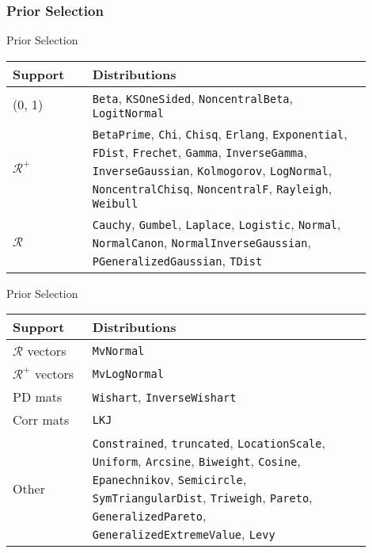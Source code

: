 \subsubsection{Prior Selection}
\begin{frame}{Prior Selection}
	\begin{center}
	\begin{tabular}{||p{0.2\linewidth} p{0.7\linewidth}||} 
	 \hline
	 Support & Distributions \\ [0.5ex] 
	 \hline\hline
	 (0, 1) & \lstinline{Beta}, \lstinline{KSOneSided}, \lstinline{NoncentralBeta}, \lstinline{LogitNormal} \\ 
	 \hline
	 $\mathcal{R}^+$ & \lstinline{BetaPrime}, \lstinline{Chi}, \lstinline{Chisq}, \lstinline{Erlang}, \lstinline{Exponential}, \lstinline{FDist}, \lstinline{Frechet}, \lstinline{Gamma}, \lstinline{InverseGamma}, \lstinline{InverseGaussian}, \lstinline{Kolmogorov}, \lstinline{LogNormal}, \lstinline{NoncentralChisq}, \lstinline{NoncentralF}, \lstinline{Rayleigh}, \lstinline{Weibull} \\
	 \hline
	 $\mathcal{R}$ & \lstinline{Cauchy}, \lstinline{Gumbel}, \lstinline{Laplace}, \lstinline{Logistic}, \lstinline{Normal}, \lstinline{NormalCanon}, \lstinline{NormalInverseGaussian}, \lstinline{PGeneralizedGaussian}, \lstinline{TDist} \\  [1ex] 
	 \hline
	\end{tabular}
	\end{center}
\end{frame}

\begin{frame}{Prior Selection}
	\begin{center}
	\begin{tabular}{||p{0.2\linewidth} p{0.7\linewidth}||} 
	 \hline
	 Support & Distributions \\ [0.5ex] 
	 \hline\hline
	 $\mathcal{R}$ vectors & \lstinline{MvNormal} \\
	 \hline
	 $\mathcal{R}^+$ vectors & \lstinline{MvLogNormal} \\
	 \hline
	 PD mats & \lstinline{Wishart}, \lstinline{InverseWishart} \\
	 \hline
	 Corr mats & \lstinline{LKJ} \\
	 \hline
	 Other & \lstinline{Constrained}, \lstinline{truncated}, \lstinline{LocationScale}, \lstinline{Uniform}, \lstinline{Arcsine}, \lstinline{Biweight}, \lstinline{Cosine}, \lstinline{Epanechnikov}, \lstinline{Semicircle}, \lstinline{SymTriangularDist}, \lstinline{Triweigh}, \lstinline{Pareto}, \lstinline{GeneralizedPareto}, \lstinline{GeneralizedExtremeValue}, \lstinline{Levy} \\ [1ex] 
	 \hline
	\end{tabular}
	\end{center}
\end{frame}

